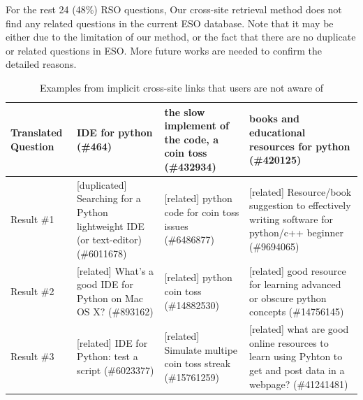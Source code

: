 For the rest 24 (48\%) RSO questions, Our cross-site retrieval method does not find any related questions in the current ESO database.
Note that it may be either due to the limitation of our method, or the fact that there are no duplicate or related questions in ESO. 
More future works are needed to confirm the detailed reasons.

 \begin{table}
 \caption{Examples from implicit cross-site links that users are not aware of}
 \centering
 \tiny
 \label{tab:reviewresult}
 \begin{tabular}{|p{0.8cm}|p{3.9cm}|p{3.9cm}|p{3.9cm}|}
 	\hline
 	Translated Question & IDE for python (\#464) & the slow implement of the code, a coin toss (\#432934) & books and educational resources for python (\#420125)\\
 	\hline
 	Result \#1 & [duplicated] Searching for a Python lightweight IDE (or text-editor) (\#6011678) &  [related] python code for coin toss issues (\#6486877) & [related] Resource/book suggestion to effectively writing software for python/c++ beginner (\#9694065)\\
 	\hline
 	Result \#2 & [related] What's a good IDE for Python on Mac OS X? (\#893162) & [related] python coin toss (\#14882530) & [related] good resource for learning advanced or obscure python concepts (\#14756145) \\
 	\hline
 	Result \#3 & [related] IDE for Python: test a script (\#6023377) & [related] Simulate multipe coin toss streak (\#15761259) & [related] what are good online resources to learn using Pyhton to get and post data in a webpage? (\#41241481)\\
	
 	\hline
 \end{tabular}
 
 \end{table}

\vspace{2mm}
\noindent {}
